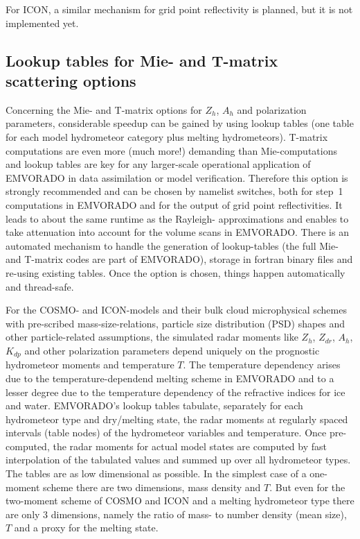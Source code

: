 \documentclass[10pt,a4paper,twoside,headinclude,footinclude,parskip=half]{scrartcl}
\newcommand{\myaktuellesection}{sec:intro}%
\newcommand{\labelsec}[1]{\label{#1}\renewcommand{\myaktuellesection}{#1}}%
\newcommand{\labelsec}[1]{\label{#1}}%
\begin{document}
For ICON, a similar mechanism for grid point reflectivity is planned, but it is not implemented yet.

\subsection{Lookup tables for Mie- and T-matrix scattering options}

\labelsec{sec:intro:lookup}

Concerning the Mie- and T-matrix options for $Z_h$, $A_h$ and polarization parameters, considerable speedup can be gained by using lookup tables (one table for
each model hydrometeor category plus melting hydrometeors). T-matrix computations are even more (much more!) demanding than Mie-computations and lookup tables are key
for any larger-scale operational application of EMVORADO in data assimilation or model verification.
Therefore this option is strongly recommended and can be chosen by namelist switches, both for step~1 computations in EMVORADO and
for the output of grid point reflectivities. It leads to about the same runtime as the Rayleigh-
approximations and enables to take attenuation into account for the volume scans in EMVORADO.
There is an automated mechanism to handle the generation of lookup-tables (the full Mie- and T-matrix codes are part of EMVORADO), storage in fortran binary files and re-using existing tables.
Once the option is chosen, things happen automatically and thread-safe. 

For the COSMO- and ICON-models and their bulk cloud microphysical schemes with pre-scribed mass-size-relations, particle size distribution (PSD) shapes and other particle-related assumptions,
the simulated radar moments like  $Z_h$, $Z_{dr}$, $A_h$, $K_{dp}$ and other polarization parameters
depend uniquely on the prognostic hydrometeor moments and temperature $T$. The temperature dependency arises due to the temperature-dependend melting scheme in EMVORADO
and to a lesser degree due to the temperature dependency of the refractive indices for ice and water. EMVORADO's lookup tables tabulate, separately for each hydrometeor type and dry/melting state, the radar moments at regularly spaced
intervals (table nodes) of the hydrometeor variables and temperature. Once pre-computed, the radar moments for actual model states are computed by fast interpolation of the tabulated values and summed up over all hydrometeor types.
The tables are as low dimensional as possible. In the simplest case of a one-moment scheme there are two dimensions, mass density and $T$. But even for the two-moment scheme of COSMO and ICON and a melting hydrometeor type there are only 3 dimensions,
namely the ratio of mass- to number density (mean size), $T$ and a proxy for the melting state.
\end{document}

